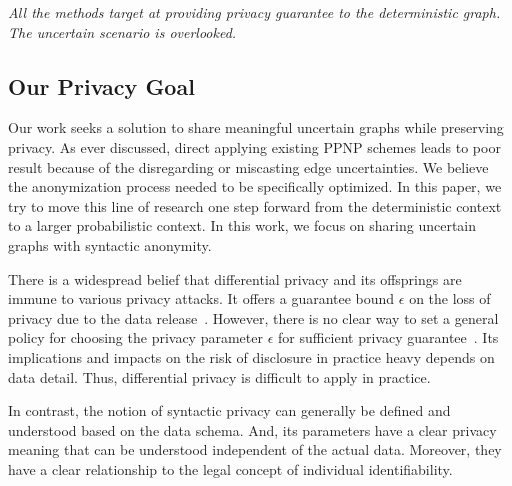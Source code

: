 \emph{All the methods target at providing privacy guarantee to the deterministic graph. The uncertain scenario is overlooked.}
\vspace{-7pt}
\subsection{Our Privacy Goal}
Our work seeks a solution to share meaningful uncertain graphs while preserving privacy.
As ever discussed, direct applying existing PPNP schemes leads to poor result because of the disregarding or miscasting edge uncertainties. We believe the anonymization process needed to be specifically optimized. In this paper, we try to move this line of research one step forward from the deterministic context to a larger probabilistic context. In this work, we focus on sharing uncertain graphs with syntactic anonymity. 

There is a widespread belief that differential privacy and its offsprings are immune to various privacy attacks. It offers a guarantee bound $\epsilon$ on the loss of privacy due to the data release~\cite{Sala_Sharing_2011,Xiao_Differentially_2014}. However, there is no clear way to set a general policy for choosing the privacy parameter $\epsilon$ for sufficient privacy guarantee~\cite{lee2011}. Its implications and impacts on the risk of disclosure in practice heavy depends on data detail. Thus, differential privacy is difficult to apply in practice. 

In contrast, the notion of syntactic privacy can generally be defined and understood based on the data schema. And, its parameters have a clear privacy meaning that can be understood independent of the actual data. Moreover, they have a clear relationship to the legal concept of individual identifiability. 


